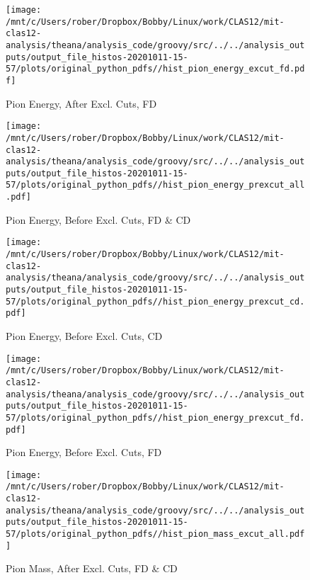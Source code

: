 \documentclass{article}
\begin{document}
\begin{landscape}
    \begin{figure}[h]
        \centering

        \texttt{[image: /mnt/c/Users/rober/Dropbox/Bobby/Linux/work/CLAS12/mit-clas12-analysis/theana/analysis\_code/groovy/src/../../analysis\_outputs/output\_file\_histos-20201011-15-57/plots/original\_python\_pdfs//hist\_pion\_energy\_excut\_fd.pdf]}
        \captionsetup{textformat=empty,labelformat=blank}
        \caption{Pion Energy, After Excl. Cuts, FD}
    \end{figure}
    \clearpage
    
    \begin{figure}[h]
        \centering

        \texttt{[image: /mnt/c/Users/rober/Dropbox/Bobby/Linux/work/CLAS12/mit-clas12-analysis/theana/analysis\_code/groovy/src/../../analysis\_outputs/output\_file\_histos-20201011-15-57/plots/original\_python\_pdfs//hist\_pion\_energy\_prexcut\_all.pdf]}
        \captionsetup{textformat=empty,labelformat=blank}
        \caption{Pion Energy, Before Excl. Cuts, FD \& CD}
    \end{figure}
    \clearpage
    
    \begin{figure}[h]
        \centering

        \texttt{[image: /mnt/c/Users/rober/Dropbox/Bobby/Linux/work/CLAS12/mit-clas12-analysis/theana/analysis\_code/groovy/src/../../analysis\_outputs/output\_file\_histos-20201011-15-57/plots/original\_python\_pdfs//hist\_pion\_energy\_prexcut\_cd.pdf]}
        \captionsetup{textformat=empty,labelformat=blank}
        \caption{Pion Energy, Before Excl. Cuts, CD}
    \end{figure}
    \clearpage
    
    \begin{figure}[h]
        \centering

        \texttt{[image: /mnt/c/Users/rober/Dropbox/Bobby/Linux/work/CLAS12/mit-clas12-analysis/theana/analysis\_code/groovy/src/../../analysis\_outputs/output\_file\_histos-20201011-15-57/plots/original\_python\_pdfs//hist\_pion\_energy\_prexcut\_fd.pdf]}
        \captionsetup{textformat=empty,labelformat=blank}
        \caption{Pion Energy, Before Excl. Cuts, FD}
    \end{figure}
    \clearpage
    
    \begin{figure}[h]
        \centering

        \texttt{[image: /mnt/c/Users/rober/Dropbox/Bobby/Linux/work/CLAS12/mit-clas12-analysis/theana/analysis\_code/groovy/src/../../analysis\_outputs/output\_file\_histos-20201011-15-57/plots/original\_python\_pdfs//hist\_pion\_mass\_excut\_all.pdf]}
        \captionsetup{textformat=empty,labelformat=blank}
        \caption{Pion Mass, After Excl. Cuts, FD \& CD}
    \end{figure}
    \clearpage
    

\end{landscape}
\end{document}
